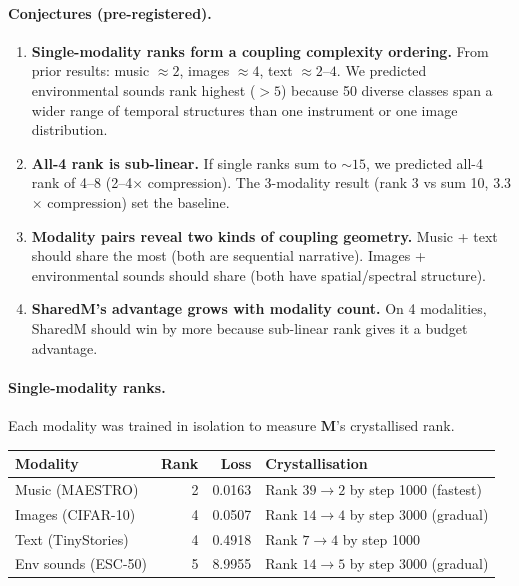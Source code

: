 \documentclass[11pt, a4paper]{article}
\newcommand{\M}{\mathbf{M}}
\theoremstyle{plain}
\theoremstyle{remark}
\begin{document}
\paragraph{Conjectures (pre-registered).}
\begin{enumerate}[nosep]
    \item \textbf{Single-modality ranks form a coupling complexity ordering.}
    From prior results: music $\approx 2$, images $\approx 4$, text $\approx 2$--$4$.
    We predicted environmental sounds rank highest ($> 5$) because 50 diverse classes span a wider range of temporal structures than one instrument or one image distribution.

    \item \textbf{All-4 rank is sub-linear.}
    If single ranks sum to ${\sim}15$, we predicted all-4 rank of 4--8 (2--4$\times$ compression).
    The 3-modality result (rank 3 vs sum 10, 3.3$\times$ compression) set the baseline.

    \item \textbf{Modality pairs reveal two kinds of coupling geometry.}
    Music + text should share the most (both are sequential narrative).
    Images + environmental sounds should share (both have spatial/spectral structure).

    \item \textbf{SharedM's advantage grows with modality count.}
    On 4 modalities, SharedM should win by more because sub-linear rank gives it a budget advantage.
\end{enumerate}

\paragraph{Single-modality ranks.}
Each modality was trained in isolation to measure $\M$'s crystallised rank.

\begin{center}\small
\begin{tabular}{@{}lrrp{6cm}@{}}
\toprule
\textbf{Modality} & \textbf{Rank} & \textbf{Loss} & \textbf{Crystallisation} \\
\midrule
Music (MAESTRO) & 2 & 0.0163 & Rank $39 \to 2$ by step 1000 (fastest) \\
Images (CIFAR-10) & 4 & 0.0507 & Rank $14 \to 4$ by step 3000 (gradual) \\
Text (TinyStories) & 4 & 0.4918 & Rank $7 \to 4$ by step 1000 \\
Env sounds (ESC-50) & 5 & 8.9955 & Rank $14 \to 5$ by step 3000 (gradual) \\
\bottomrule
\end{tabular}
\end{center}
\end{document}
